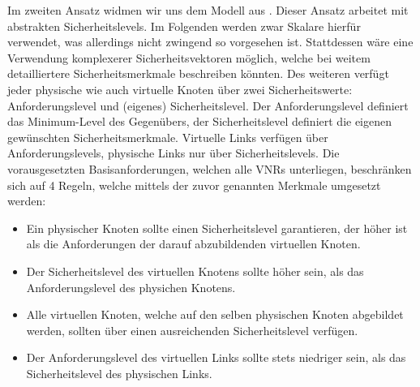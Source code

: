 \documentclass{lni}
\begin{document}
Im zweiten Ansatz widmen wir uns dem Modell aus \cite{algo2}. Dieser Ansatz arbeitet mit abstrakten Sicherheitslevels. Im Folgenden werden zwar Skalare hierfür verwendet, was allerdings nicht zwingend so vorgesehen ist. Stattdessen wäre eine Verwendung komplexerer Sicherheitsvektoren möglich, welche bei weitem detailliertere Sicherheitsmerkmale  beschreiben könnten. Des weiteren verfügt jeder physische wie auch virtuelle Knoten über zwei Sicherheitswerte: Anforderungslevel und (eigenes) Sicherheitslevel. Der Anforderungslevel definiert das Minimum-Level des Gegenübers, der Sicherheitslevel definiert die eigenen gewünschten Sicherheitsmerkmale. Virtuelle Links verfügen über Anforderungslevels, physische Links nur über Sicherheitslevels. Die vorausgesetzten Basisanforderungen, welchen alle VNRs unterliegen, beschränken sich auf 4 Regeln, welche mittels der zuvor genannten Merkmale umgesetzt werden:
\begin{itemize}
\item Ein physischer Knoten sollte einen Sicherheitslevel garantieren, 
   der höher ist als die Anforderungen der darauf abzubildenden
   virtuellen Knoten.

\item Der Sicherheitslevel des virtuellen Knotens sollte höher sein, 
   als das Anforderungslevel des physichen Knotens.

\item Alle virtuellen Knoten, welche auf den selben physischen Knoten
   abgebildet werden, sollten über einen ausreichenden Sicherheitslevel
   verfügen.

\item Der Anforderungslevel des virtuellen Links sollte stets niedriger
   sein, als das Sicherheitslevel des physischen Links.
\end{itemize}%
\end{document}
